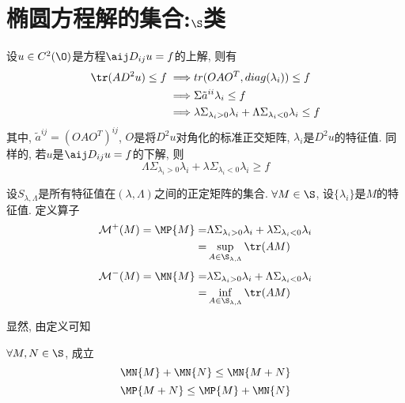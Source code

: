 \section{椭圆方程解的集合:\texorpdfstring{$\S$}{S}类}
设$u \in C^2(\O)$是方程$\aij D_{ij}u=f$的上解, 则有
\begin{equation}
    \begin{split}
        \tr (AD^2u) \le f \implies& tr(OAO^T, diag(\lambda_i)) \le f \\
        \implies & \Sigma \tilde{a}^{ii}\lambda_i \le f \\
        \implies & \lambda \Sigma_{\lambda_i >0} \lambda_i + \Lambda \Sigma_{\lambda_i <0} \lambda_i \le f
    \end{split}
\end{equation}
其中, $\tilde{a}^{ij}=(OAO^T)^{ij}$, $O$是将$D^2u$对角化的标准正交矩阵, $\lambda_i$是$D^2u$的特征值.  同样的, 若$u$是$\aij D_{ij}u=f$的下解, 则
\begin{equation}
     \Lambda \Sigma_{\lambda_i >0} \lambda_i + \lambda \Sigma_{\lambda_i <0} \lambda_i \ge f
\end{equation}
\begin{definition}
    设$S_{\lambda, \Lambda}$是所有特征值在$(\lambda, \Lambda)$之间的正定矩阵的集合.  $\forall M \in \S$, 设$\{\lambda_i\}$是$M$的特征值.  定义算子
    \begin{equation}
        \begin{split}
            \mathcal{M}^+(M)= \MP{M} = &\Lambda \Sigma_{\lambda_i>0}\lambda_i+\lambda\Sigma_{\lambda_i<0}\lambda_i  \\
            = &\sup_{A\in \S_{\lambda, \Lambda}}\tr(AM)
        \end{split}
    \end{equation}
    \begin{equation}
        \begin{split}
            \mathcal{M}^-(M)= \MN{M} = &\lambda \Sigma_{\lambda_i>0}\lambda_i+\Lambda\Sigma_{\lambda_i<0}\lambda_i  \\
            = &\inf_{A\in \S_{\lambda, \Lambda}}\tr(AM)
        \end{split}
    \end{equation}
\end{definition}
显然, 由定义可知
\begin{proposition} \label{property_m}
    $\forall M, N \in \S$, 成立
    \begin{equation}
        \MN{M}+\MN{N}\le \MN{M+N}
    \end{equation}
    \begin{equation}
        \MP{M+N} \le \MP{M} + \MN{N}
    \end{equation}
\end{proposition}
